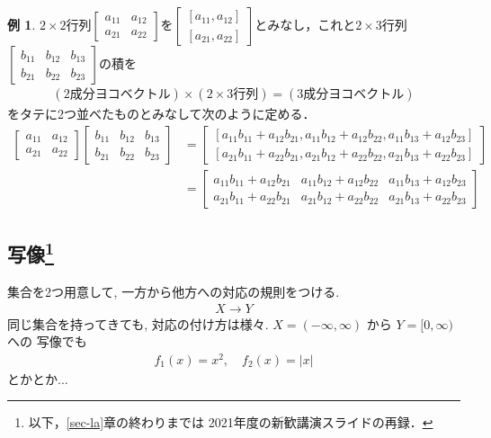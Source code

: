 \documentclass[11pt, a4paper, dvipdfmx]{jsarticle}
\theoremstyle{definition}
\newtheorem{Example}[Axiom]{例}
\theoremstyle{mystyle}
\numberwithin{equation}{section} %
\begin{document}
\begin{Example}
    $2\times 2$行列$\begin{bmatrix}
        a_{11}&a_{12}\\
        a_{21}&a_{22}
    \end{bmatrix}$を$\begin{bmatrix}
        [a_{11}, a_{12}]\\
        [a_{21}, a_{22}]
    \end{bmatrix}$とみなし，これと$2\times 3$行列$\begin{bmatrix}
        b_{11}&b_{12}&b_{13}\\
        b_{21}&b_{22}&b_{23}
    \end{bmatrix}$の積を
    \begin{align*}
        (2\text{成分ヨコベクトル})\times(2\times 3\text{行列})=(3\text{成分ヨコベクトル})
    \end{align*}
    をタテに2つ並べたものとみなして次のように定める．
    \begin{align*}
        \begin{bmatrix}
            a_{11}&a_{12}\\
            a_{21}&a_{22}
        \end{bmatrix}
        \begin{bmatrix}
            b_{11}&b_{12}&b_{13}\\
            b_{21}&b_{22}&b_{23}
        \end{bmatrix}
        &=
        \begin{bmatrix}
            [a_{11}b_{11}+a_{12}b_{21},
             a_{11}b_{12}+a_{12}b_{22},
             a_{11}b_{13}+a_{12}b_{23}]\\
            [a_{21}b_{11}+a_{22}b_{21},
             a_{21}b_{12}+a_{22}b_{22},
             a_{21}b_{13}+a_{22}b_{23}]
        \end{bmatrix}\\
        &=
        \begin{bmatrix}
            a_{11}b_{11}+a_{12}b_{21}&
            a_{11}b_{12}+a_{12}b_{22}&
            a_{11}b_{13}+a_{12}b_{23}\\
            a_{21}b_{11}+a_{22}b_{21}&
            a_{21}b_{12}+a_{22}b_{22}&
            a_{21}b_{13}+a_{22}b_{23}
        \end{bmatrix}
    \end{align*}
\end{Example}

\subsection{写像\footnote{
    以下，\ref{sec-la}章の終わりまでは
    2021年度の新歓講演スライドの再録．}}
集合を2つ用意して, 一方から他方への対応の規則をつける. 
\begin{align*}
    X \longrightarrow Y
\end{align*}
同じ集合を持ってきても, 対応の付け方は様々. 
$X = (-\infty,\infty)$ から $Y = [0,\infty)$ への
写像でも
\begin{align*}
    f_1(x) = x^2,\quad f_2(x) = |x|
\end{align*}
とかとか...
\end{document}
